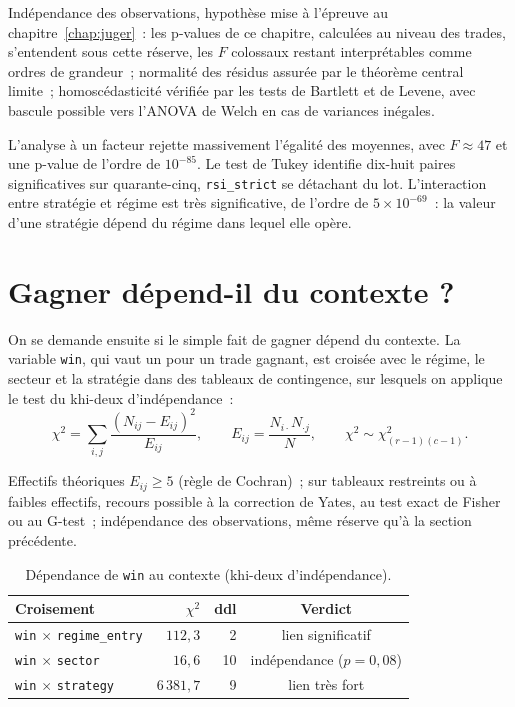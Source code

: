 \begin{conditions}
Indépendance des observations, hypothèse mise à l'épreuve au
chapitre~\ref{chap:juger}~: les p-values de ce chapitre, calculées au
niveau des trades, s'entendent sous cette réserve, les \(F\) colossaux
restant interprétables comme ordres de grandeur~; normalité des résidus
assurée par le théorème central limite~; homoscédasticité vérifiée par
les tests de Bartlett et de Levene, avec bascule possible vers l'ANOVA
de Welch en cas de variances inégales.
\end{conditions}

L'analyse à un facteur rejette massivement l'égalité des moyennes, avec
\(F\approx 47\) et une p-value de l'ordre de $10^{-85}$. Le test de
Tukey identifie dix-huit paires significatives sur quarante-cinq,
\texttt{rsi\_strict} se détachant du lot. L'interaction entre stratégie
et régime est très significative, de l'ordre de $5\times10^{-69}$~: la
valeur d'une stratégie dépend du régime dans lequel elle opère.

\section{Gagner dépend-il du contexte ?}
\label{sec:b1-etape3}

On se demande ensuite si le simple fait de gagner dépend du contexte. La
variable \texttt{win}, qui vaut un pour un trade gagnant, est croisée
avec le régime, le secteur et la stratégie dans des tableaux de
contingence, sur lesquels on applique le test du khi-deux
d'indépendance~:
\[
  \chi^2 = \sum_{i,j}\frac{(N_{ij}-E_{ij})^2}{E_{ij}},
  \qquad E_{ij}=\frac{N_{i\cdot}N_{\cdot j}}{N},
  \qquad \chi^2 \sim \chi^2_{(r-1)(c-1)}.
\]

\begin{conditions}
Effectifs théoriques \(E_{ij}\ge 5\) (règle de Cochran)~; sur tableaux
restreints ou à faibles effectifs, recours possible à la correction de
Yates, au test exact de Fisher ou au G-test~; indépendance des
observations, même réserve qu'à la section précédente.
\end{conditions}

\begin{table}[H]
\centering
\caption{Dépendance de \texttt{win} au contexte (khi-deux d'indépendance).}
\label{tab:b1-etape3}
\small
\begin{tabular}{@{}lrrc@{}}
\toprule
Croisement & $\chi^2$ & ddl & Verdict \\
\midrule
\texttt{win} $\times$ \texttt{regime\_entry} & $112{,}3$   & 2  & lien significatif \\
\texttt{win} $\times$ \texttt{sector}        & $16{,}6$    & 10 & indépendance ($p=0{,}08$) \\
\texttt{win} $\times$ \texttt{strategy}      & $6\,381{,}7$& 9  & lien très fort \\
\bottomrule
\end{tabular}
\end{table}

